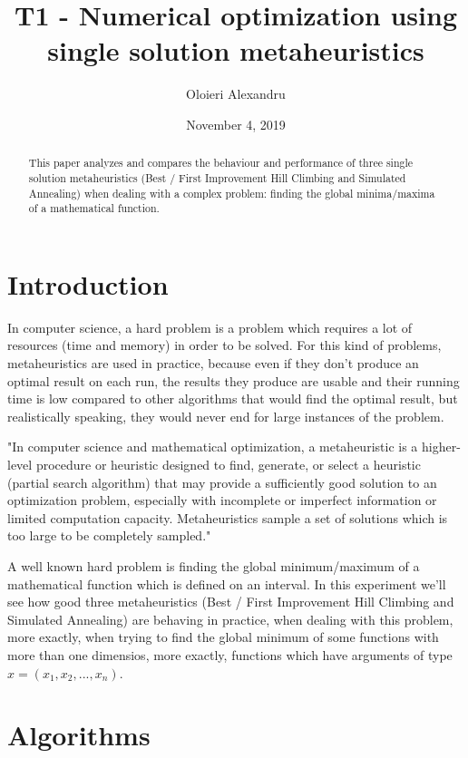 \documentclass[a4paper]{article}
\title{T1 - Numerical optimization using single solution metaheuristics}
\author{Oloieri Alexandru}
\date{November 4, 2019}
\begin{document}
	
\maketitle
	
\begin{abstract}
	\centering
	This paper analyzes and compares the behaviour and performance of three single solution metaheuristics (Best / First Improvement Hill Climbing and Simulated Annealing) when dealing with a complex problem: finding the global minima/maxima of a mathematical function.
\end{abstract}
	
\section{Introduction}

In computer science, a hard problem is a problem which requires a lot of resources (time and memory) in order to be solved. For this kind of problems, metaheuristics are used in practice, because even if they don't produce an optimal result on each run, the results they produce are usable and their running time is low compared to other algorithms that would find the optimal result, but realistically speaking, they would never end for large instances of the problem.

\begin{displayquote}
"In computer science and mathematical optimization, a metaheuristic is a higher-level procedure or heuristic designed to find, generate, or select a heuristic (partial search algorithm) that may provide a sufficiently good solution to an optimization problem, especially with incomplete or imperfect information or limited computation capacity. Metaheuristics sample a set of solutions which is too large to be completely sampled."
\end{displayquote}

A well known hard problem is finding the global minimum/maximum of a mathematical function which is defined on an interval. In this experiment we'll see how good three metaheuristics (Best / First Improvement Hill Climbing and Simulated Annealing) are behaving in practice, when dealing with this problem, more exactly, when trying to find the global minimum of some functions with more than one dimensios, more exactly, functions which have arguments of type $x = (x_1,x_2,...,x_n)$.

\section{Algorithms}
\end{document}
